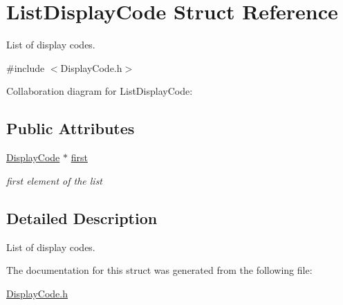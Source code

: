 \hypertarget{structListDisplayCode}{}\section{List\+Display\+Code Struct Reference}
\label{structListDisplayCode}


List of display codes.  




{\ttfamily \#include $<$Display\+Code.\+h$>$}



Collaboration diagram for List\+Display\+Code\+:
\subsection*{Public Attributes}
\begin{DoxyCompactItemize}
\item 
\hyperlink{structDisplayCode}{Display\+Code} $\ast$ \hyperlink{structListDisplayCode_a99e86ef649bd63f7229f45a1de400f3a}{first}\hypertarget{structListDisplayCode_a99e86ef649bd63f7229f45a1de400f3a}{}\label{structListDisplayCode_a99e86ef649bd63f7229f45a1de400f3a}

\begin{DoxyCompactList}\small\item\em first element of the list \end{DoxyCompactList}\end{DoxyCompactItemize}


\subsection{Detailed Description}
List of display codes. 

The documentation for this struct was generated from the following file\+:\begin{DoxyCompactItemize}
\item 
\hyperlink{DisplayCode_8h}{Display\+Code.\+h}\end{DoxyCompactItemize}
